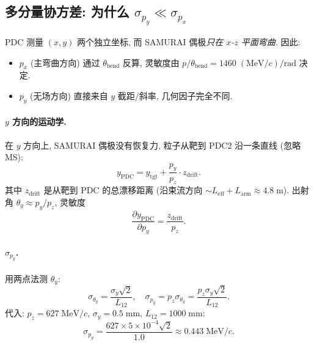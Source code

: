 \subsection{多分量协方差: 为什么 $\sigma_{p_y} \ll \sigma_{p_x}$}

PDC 测量 $(x, y)$ 两个独立坐标, 而 SAMURAI 偶极\emph{只在 $x$-$z$ 平面弯曲}. 因此:
\begin{itemize}[nosep, leftmargin=2em]
  \item $p_x$ (主弯曲方向) 通过 $\theta_\mathrm{bend}$ 反算, 灵敏度由 $p / \theta_\mathrm{bend} = 1460\;(\mathrm{MeV}/c)/\mathrm{rad}$ 决定.
  \item $p_y$ (无场方向) 直接来自 $y$ 截距/斜率, 几何因子完全不同.
\end{itemize}

\paragraph{$y$ 方向的运动学.} 在 $y$ 方向上, SAMURAI 偶极没有恢复力, 粒子从靶到 PDC2 沿一条直线 (忽略 MS):
\begin{equation}
  y_\mathrm{PDC} = y_\mathrm{tgt} + \frac{p_y}{p_z} \cdot z_\mathrm{drift}.
\end{equation}
其中 $z_\mathrm{drift}$ 是从靶到 PDC 的总漂移距离 (沿束流方向 $\sim L_\mathrm{eff} + L_\mathrm{arm} \approx 4.8\;\mathrm{m}$). 出射角 $\theta_y \approx p_y / p_z$, 灵敏度
\begin{equation}
  \frac{\partial y_\mathrm{PDC}}{\partial p_y} = \frac{z_\mathrm{drift}}{p_z}.
\end{equation}

\paragraph{$\sigma_{p_y}$.} 用两点法测 $\theta_y$:
\begin{equation}
  \sigma_{\theta_y} = \frac{\sigma_y \sqrt 2}{L_{12}},
  \quad
  \sigma_{p_y} = p_z \sigma_{\theta_y}
  = \frac{p_z \sigma_y \sqrt 2}{L_{12}}.
  \label{eq:partIc:sigma_py}
\end{equation}
代入: $p_z = 627\;\mathrm{MeV}/c$, $\sigma_y = 0.5\;\mathrm{mm}$, $L_{12} = 1000\;\mathrm{mm}$:
\begin{equation}
  \sigma_{p_y} = \frac{627 \times 5 \times 10^{-4} \sqrt 2}{1.0}
  \approx 0.443\;\mathrm{MeV}/c.
\end{equation}

